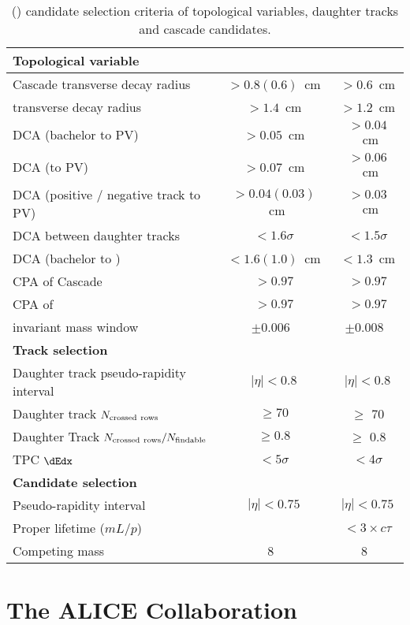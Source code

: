\documentclass[ALICE,manyauthors]{cernphprep}
\begin{document}
\begin{table}[!ht]
	\begin{center}
		\caption{\Xis(\Oms) candidate selection criteria of topological variables, daughter tracks and cascade candidates.}
		\label{tab:CascadeCut}
		\begin{tabularx}{\textwidth}{@{} lCC @{}}
			\toprule
			\textbf{Topological variable} & \textbf{\pp} & \textbf{\pPb} \\
			\midrule
			Cascade transverse decay radius & $> 0.8(0.6)$~cm & $> 0.6$~cm \\
			\Vzero transverse decay radius & $> 1.4$~cm     & $> 1.2$~cm \\
			DCA (bachelor to PV)           & $> 0.05$~cm    & $> 0.04$~cm \\
			DCA (\Vzero to PV)             & $> 0.07$~cm    & $> 0.06$~cm \\
			DCA (positive / negative track to PV) & $> 0.04(0.03)$~cm & $> 0.03$~cm  \\
			DCA between \Vzero daughter tracks & $< 1.6\sigma$     & $< 1.5\sigma$ \\
			DCA (bachelor to \Vzero) & $< 1.6(1.0)$~cm & $< 1.3$~cm \\
			CPA of Cascade          & $> 0.97$       & $> 0.97$  \\
			CPA of \Vzero           & $> 0.97$       & $> 0.97$  \\
			\Vzero invariant mass window & $\pm 0.006$~\GeVmass & $\pm 0.008$~\GeVmass \\
			\midrule
			\textbf{Track selection} \\
			\midrule
			Daughter track pseudo-rapidity interval & $|\eta| < 0.8$ & $|\eta| < 0.8$ \\
			Daughter track $N_{\rm crossed~rows}$  & $\geq 70$      & $\geq$ 70 \\
			Daughter Track $N_{\rm crossed~rows}/N_{\rm findable}$ &$\geq 0.8$ &$\geq$ 0.8 \\
			TPC $\dEdx$ & $< 5\sigma$ & $< 4\sigma$ \\
			\midrule
			\textbf{Candidate selection} \\
			\midrule
			Pseudo-rapidity interval & $|\eta| < 0.75$ &$|\eta| < 0.75$ \\
			Proper lifetime ($mL/p$) & & $< 3 \times c\tau$ \\
			Competing mass          & $8$~\MeVmass & $8$~\MeVmass \\
			\bottomrule
		\end{tabularx}
	\end{center}
\end{table}
\section{The ALICE Collaboration}
\label{app:collab}
%  
\end{document}
